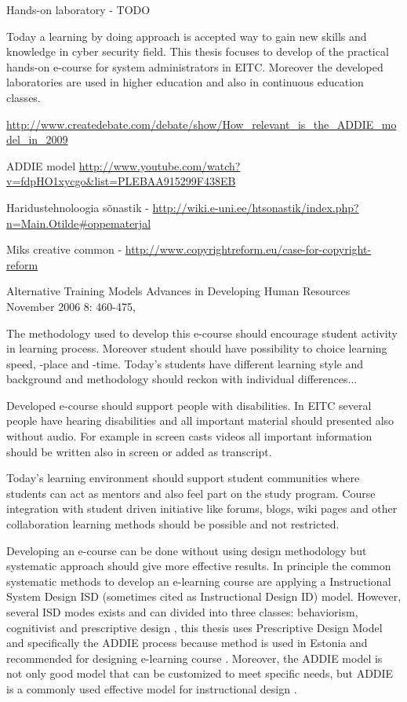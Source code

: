 Hands-on laboratory - {\color{red} TODO }


Today a learning by doing approach is accepted way to gain new skills and knowledge in cyber security field. This thesis focuses to develop of the practical hands-on e-course for system administrators in \gls{EITC}. Moreover the developed laboratories are used in higher education and also in continuous education classes.



\url{http://www.createdebate.com/debate/show/How_relevant_is_the_ADDIE_model_in_2009}

ADDIE model \url{http://www.youtube.com/watch?v=fdpHO1xycgo&list=PLEBAA915299F438EB}


Haridustehnoloogia sõnastik - \url{http://wiki.e-uni.ee/htsonastik/index.php?n=Main.Otilde#oppematerjal}

Miks creative common - \url{http://www.copyrightreform.eu/case-for-copyright-reform}

Alternative Training Models
Advances in Developing Human Resources November 2006 8: 460-475,


The methodology used to develop this e-course should encourage student activity in learning process. Moreover student should have possibility to choice learning speed, -place and -time. Today's students have different learning style and background and methodology should reckon with individual differences...

Developed e-course should support people with disabilities. In \gls{EITC} several people have hearing disabilities and all important material should presented also without audio. For example in screen casts videos all important information should be written also in screen or added as transcript.

Today’s learning environment should support student communities where students can act as mentors and also feel part on the study program. Course integration with student driven initiative like forums, blogs, wiki pages and other collaboration learning methods should be possible and not restricted.


Developing an e-course can be done without using design methodology but systematic approach should give more effective results. In principle the common systematic methods to develop an e-learning course are applying a Instructional System Design \gls{ISD} (sometimes cited as  Instructional Design \gls{ID}) model. However, several \gls{ISD} modes exists and can divided into three classes: behaviorism, cognitivist and prescriptive design \citep{website:id_models}, this thesis uses Prescriptive Design Model and specifically the \gls{ADDIE} process because method is used in Estonia and recommended for designing e-learning course \citep[p.~5]{OppeArenduskeskus2010}. Moreover, the \gls{ADDIE} model is not only good model that can be customized to meet specific needs, but ADDIE is a commonly used effective model for instructional  design \citep{ieee_addie_1607206}.


